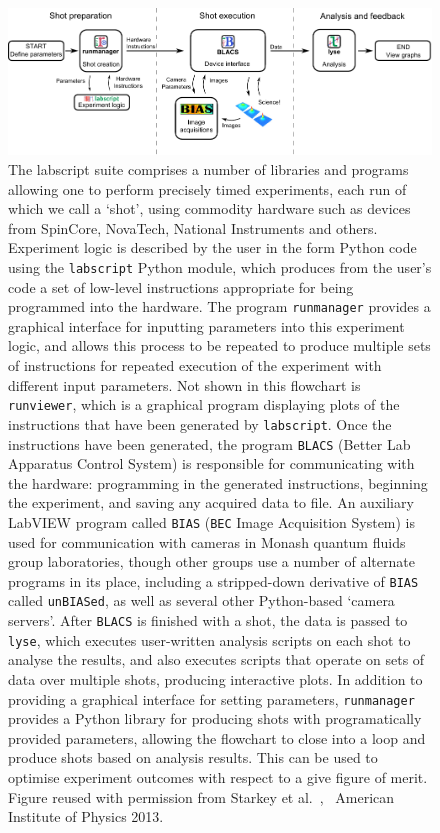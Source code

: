 \begin{figure}
\begin{center}
\includegraphics[width=\textwidth]{figures/software/flow_chart_simple-eps-converted-to.pdf}
\caption{The labscript suite comprises a number of libraries and programs allowing one to perform precisely timed experiments, each run of which we call a `shot', using commodity hardware such as devices from SpinCore, NovaTech, National Instruments and others. Experiment logic is described by the user in the form Python code using the \texttt{labscript} Python module, which produces from the user's code a set of low-level instructions appropriate for being programmed into the hardware. The program \texttt{runmanager} provides a graphical interface for inputting parameters into this experiment logic, and allows this process to be repeated to produce multiple sets of instructions for repeated execution of the experiment with different input parameters. Not shown in this flowchart is \texttt{runviewer}, which is a graphical program displaying plots of the instructions that have been generated by \texttt{labscript}. Once the instructions have been generated, the program \texttt{BLACS} (Better Lab Apparatus Control System) is responsible for communicating with the hardware: programming in the generated instructions, beginning the experiment, and saving any acquired data to file. An auxiliary LabVIEW program called \texttt{BIAS} (\texttt{BEC} Image Acquisition System) is used for communication with cameras in Monash quantum fluids group laboratories, though other groups use a number of alternate programs in its place, including a stripped-down derivative of \texttt{BIAS} called \texttt{unBIASed}, as well as several other Python-based `camera servers'. After \texttt{BLACS} is finished with a shot, the data is passed to \texttt{lyse}, which executes user-written analysis scripts on each shot to analyse the results, and also executes scripts that operate on sets of data over multiple shots, producing interactive plots. In addition to providing a graphical interface for setting parameters, \texttt{runmanager} provides a Python library for producing shots with programatically provided parameters, allowing the flowchart to close into a loop and produce shots based on analysis results. This can be used to optimise experiment outcomes with respect to a give figure of merit. Figure reused with permission from Starkey et al.~\cite{starkey_scripted_2013}, \textcopyright\ American Institute of Physics 2013.}\label{fig:labscript_flowchart}
\end{center}
\end{figure}

